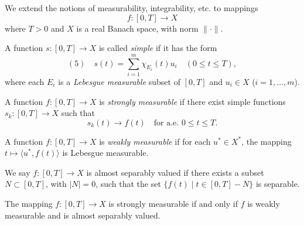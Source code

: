 We extend the notions of measurability, integrability, etc. to mappings
$$f : [0, T] \to X$$
where $T > 0$ and $X$ is a real Banach space, with norm $\| \cdot \|$.

\begin{definition}
\label{def:simple-function-banach-valued}
A function $s : [0, T] \to X$ is called \textit{simple} if it has the form
$$(5) \quad s(t) = \sum_{i=1}^{m} \chi_{E_i}(t) u_i \quad (0 \le t \le T),$$
where each $E_i$ is a \textit{Lebesgue measurable} subset of $[0, T]$ and $u_i \in X$ ($i = 1, \ldots, m$).
\end{definition}

\begin{definition}
\label{def:strongly-measurable-function}
A function $f : [0, T] \to X$ is \textit{strongly measurable} if there exist simple functions $s_k : [0, T] \to X$ such that
$$s_k(t) \to f(t) \quad \text{for a.e. } 0 \le t \le T.$$
\end{definition}

\begin{definition}
\label{def:weakly-measurable-function}
A function $f : [0, T] \to X$ is \textit{weakly measurable} if for each $u^* \in X^*$, the mapping $t \mapsto \langle u^*, f(t) \rangle$ is Lebesgue measurable.
\end{definition}

\begin{definition}
\label{def:almost-separably-valued}
We say $f : [0,T] \to X$ is almost separably valued if there exists a subset $N \subset [0,T]$, with $|N| = 0$, such that the set $\{f(t) \mid t \in [0,T] - N\}$ is separable.
\end{definition}

\begin{theorem}[Pettis]
\label{thm:pettis-theorem}
The mapping $f : [0,T] \to X$ is strongly measurable if and only if $f$ is weakly measurable and is almost separably valued.
\end{theorem}

